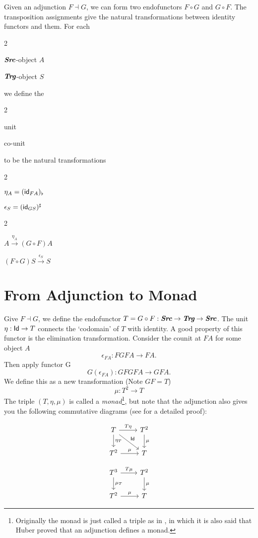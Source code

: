 \newcommand{\dual}[2]{
    \begin{multicols}{2}
        \begin{center}
            #1
        \end{center}
        \columnbreak 
        \begin{center}
            #2
        \end{center}
    \end{multicols}
}

\begin{definition}
    Given an adjunction $F\dashv G$, we can form two endofunctors
    $F\circ G$ and $G\circ F$. The transposition assignments give
    the natural transformations between identity functors and them.
    For each
    \dual{$\textbf{\em Src}$-object $A$}{$\textbf{\em Trg}$-object $S$}
    we define the
    \dual{\sf unit}{\sf co-unit}
    to be the natural transformations
    \dual{$\eta_A=(\text{\sf id}_{FA})_\flat$}{$\epsilon_S=(\text{\sf id}_{GS})^\sharp$}
    \dual{$A\overset{\eta_A}\longrightarrow(G\circ F)A$}
        {$(F\circ G)S\overset{\epsilon_S}\longrightarrow S$}  
\end{definition}

\section{From Adjunction to Monad}
Give $F\dashv G$, we define the endofunctor $T=G\circ F:\textbf{\em Src}\to\textbf{\em Trg}\to\textbf{\em Src}$.
The unit $\eta:\text{\sf Id}\to T$ connects the `codomain' of $T$ with identity.
A good property of this functor is the elimination transformation.
Consider the counit at $FA$ for some object $A$
$$
    \epsilon_{FA}:FGFA\to FA.
$$
Then apply functor G
$$
    G(\epsilon_{FA}):GFGFA\to GFA.
$$
We define this as a new transformation (Note $GF=T$)
$$
    \mu:T^2\to T
$$
The triple $(T,\eta,\mu)$ is called a {\it monad}\footnote{
Originally the monad is just called a triple as in 
\cite{Introduction-to-higher-order-categorical-logic}, in which it is
also said that Huber proved that an adjunction defines a monad. },
but note that the adjunction also gives you the following commutative diagrams (see \cite{cat-awodey} for a detailed proof): 

$$
\begin{tikzcd}
    T \arrow{r}{T\eta} \arrow{d}{\eta_T} \arrow{rd}{\Id} & T^2
    \arrow{d}{\mu} \\
    T^2 \arrow{r}{\mu} & T
\end{tikzcd}
$$

$$
\begin{tikzcd}
    T^3 \arrow{r}{T\mu} \arrow{d}{\mu_T} & T^2
    \arrow{d}{\mu} \\
    T^2 \arrow{r}{\mu} & T
\end{tikzcd}
$$

